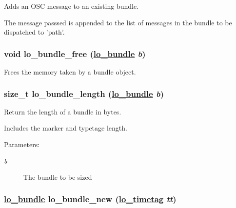 Adds an OSC message to an existing bundle. 

The message passsed is appended to the list of messages in the bundle to be dispatched to 'path'. \hypertarget{group__liblolowlevel_g2ba37901788d863d08a2b7d6ca4250e6}{
\subsubsection[lo\_\-bundle\_\-free]{\setlength{\rightskip}{0pt plus 5cm}void lo\_\-bundle\_\-free (\hyperlink{lo__types_8h_96254950ad34e9cfbf8a6613fc74025b}{lo\_\-bundle} {\em b})}}
\label{group__liblolowlevel_g2ba37901788d863d08a2b7d6ca4250e6}


Frees the memory taken by a bundle object. 

\hypertarget{group__liblolowlevel_ga105f1c5b97a16beabdb6b4ab7af2b46}{
\subsubsection[lo\_\-bundle\_\-length]{\setlength{\rightskip}{0pt plus 5cm}size\_\-t lo\_\-bundle\_\-length (\hyperlink{lo__types_8h_96254950ad34e9cfbf8a6613fc74025b}{lo\_\-bundle} {\em b})}}
\label{group__liblolowlevel_ga105f1c5b97a16beabdb6b4ab7af2b46}


Return the length of a bundle in bytes. 

Includes the marker and typetage length.

\begin{Desc}
\item[Parameters:]
\begin{description}
\item[{\em b}]The bundle to be sized \end{description}
\end{Desc}
\hypertarget{group__liblolowlevel_g330a4a4e6227b185b3ec6219ff3e2859}{
\subsubsection[lo\_\-bundle\_\-new]{\setlength{\rightskip}{0pt plus 5cm}\hyperlink{lo__types_8h_96254950ad34e9cfbf8a6613fc74025b}{lo\_\-bundle} lo\_\-bundle\_\-new (\hyperlink{structlo__timetag}{lo\_\-timetag} {\em tt})}}
\label{group__liblolowlevel_g330a4a4e6227b185b3ec6219ff3e2859}


